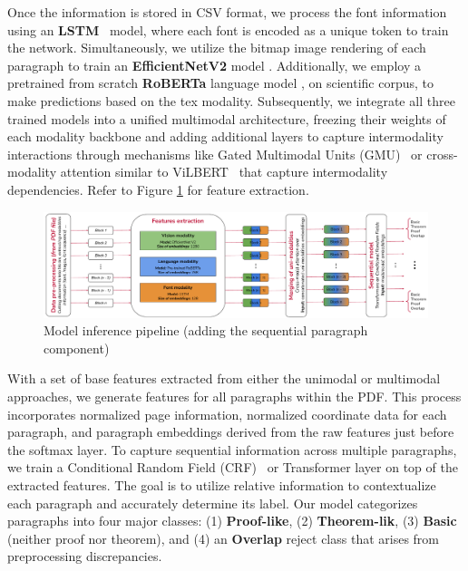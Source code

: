 \documentclass[runningheads]{llncs}
\begin{document}
Once the information is stored in CSV format, we process the font information using an \textbf{LSTM}~\cite{hochreiter1997long} model, where 
each font is encoded as a unique token to train the network. Simultaneously, we utilize the bitmap image 
rendering of each paragraph to train an \textbf{EfficientNetV2} model \cite{efficientnet}. Additionally, we employ a pretrained from scratch \textbf{RoBERTa} language model \cite{mishra:tel-04665528}, 
on scientific corpus, to make predictions based on the tex modality. Subsequently, we 
integrate all three trained models into a unified multimodal architecture, freezing their weights of each modality backbone and adding 
additional layers to capture intermodality interactions through mechanisms like Gated Multimodal Units 
(GMU)~\cite{arevalo2020gated} or cross-modality attention similar to ViLBERT~\cite{DBLP:conf/nips/LuBPL19} that capture intermodality dependencies. Refer to Figure \ref{fig:generalpipeline} for feature extraction.


\begin{figure}[h]
    \centering
    \includegraphics[width=\textwidth]{images/general_pipeline.pdf}
    \caption{Model inference pipeline (adding the sequential paragraph component)}
    \label{fig:generalpipeline}
\end{figure}


With a set of base features extracted from either the unimodal or multimodal approaches, we generate 
features for all paragraphs within the PDF. This process incorporates normalized page information, 
normalized coordinate data for each paragraph, and paragraph embeddings derived from the raw features 
just before the softmax layer. To capture sequential information across multiple paragraphs, we train a 
Conditional Random Field (CRF)~\cite{crf} or Transformer layer on top of the extracted features. The goal is to utilize 
relative information to contextualize each paragraph and accurately determine its label. Our model 
categorizes paragraphs into four major classes: (1) \textbf{Proof-like}, (2) \textbf{Theorem-lik}, (3) \textbf{Basic} (neither 
proof nor theorem), and (4) an \textbf{Overlap} reject class that arises from preprocessing discrepancies.
\end{document}
